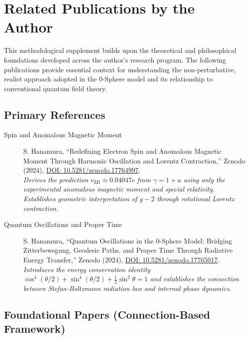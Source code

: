 \documentclass[12pt,letterpaper]{article}
\begin{document}

\section*{Related Publications by the Author}

This methodological supplement builds upon the theoretical and philosophical foundations developed across the author's research program. The following publications provide essential context for understanding the non-perturbative, realist approach adopted in the 0-Sphere model and its relationship to conventional quantum field theory.

\subsection*{Primary References}

\begin{description}
\item[Spin and Anomalous Magnetic Moment] S. Hanamura, ``Redefining Electron Spin and Anomalous Magnetic Moment Through Harmonic Oscillation and Lorentz Contraction,'' Zenodo (2024), \href{https://doi.org/10.5281/zenodo.17764997}{DOI: 10.5281/zenodo.17764997}. \\
\textit{Derives the prediction $v_{\mathrm{ZB}} \approx 0.04047c$ from $\gamma = 1 + a$ using only the experimental anomalous magnetic moment and special relativity. Establishes geometric interpretation of $g-2$ through rotational Lorentz contraction.}

\item[Quantum Oscillations and Proper Time] S. Hanamura, ``Quantum Oscillations in the 0-Sphere Model: Bridging Zitterbewegung, Geodesic Paths, and Proper Time Through Radiative Energy Transfer,'' Zenodo (2024), \href{https://doi.org/10.5281/zenodo.17765017}{DOI: 10.5281/zenodo.17765017}. \\
\textit{Introduces the energy conservation identity $\cos^4(\theta/2) + \sin^4(\theta/2) + \frac{1}{2}\sin^2\theta = 1$ and establishes the connection between Stefan-Boltzmann radiation law and internal phase dynamics.}
\end{description}

\subsection*{Foundational Papers (Connection-Based Framework)}
\end{document}
